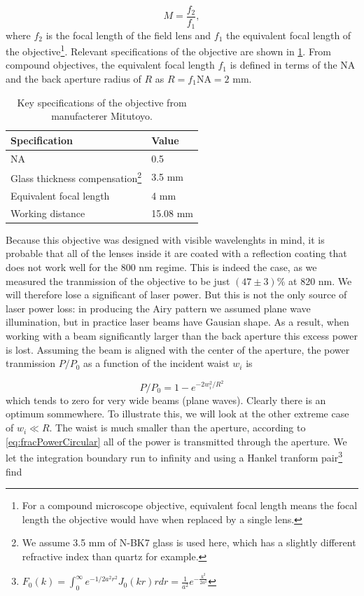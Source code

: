 \begin{equation}\label{eq:InfinityMagnification}
    M = \frac{f_2}{f_1},
\end{equation}
where $f_2$ is the focal length of the field lens and $f_1$ the equivalent focal length of the objective\footnote{For a compound microscope objective, equivalent focal length means the focal length the objective would have when replaced by a single lens.}.
Relevant specifications of the objective are shown in \cref{table:MitutoyoSpecs}. 
From compound objectives, the equivalent focal length $f_1$ is defined in terms of the \ac{NA} and the back aperture radius of $R$ as $R = f_1 \text{NA} = 2$ mm. 

\begin{table}[h]
    \centering
    \caption{Key specifications of the objective from manufacterer Mitutoyo.}
    \label{table:MitutoyoSpecs}
    \begin{tabular}{l | l}
        \textbf{Specification}       & \textbf{Value} \\ \hline 
        NA                           & 0.5            \\ \hline
        Glass thickness compensation\footnote{We assume 3.5 mm of N-BK7 glass is used here, which has a slightly different refractive index than quartz for example.} & 3.5 mm         \\ \hline
        Equivalent focal length      & 4 mm           \\ \hline
        Working distance             & 15.08 mm      
    \end{tabular}
\end{table}
Because this objective was designed with visible wavelenghts in mind, it is probable that all of the lenses inside it are coated with a reflection coating that does not work well for the 800 nm regime. 
This is indeed the case, as we measured the tranmission of the objective to be just $(47 \pm 3)\%$ at 820 nm. We will therefore lose a significant of laser power. 
But this is not the only source of laser power loss: in producing the Airy pattern we assumed plane wave illumination, but in practice laser beams have Gausian shape. 
As a result, when working with a beam significantly larger than the back aperture this excess power is lost. 
Assuming the beam is aligned with the center of the aperture, the power tranmission $P/P_0$ as a function of the incident waist $w_i$ is

\begin{equation}\label{eq:fracPowerCircular}
    P/P_0 = 1 - e^{-2w_i^2/R^2}
\end{equation}
which tends to zero for very wide beams (plane waves). Clearly there is an optimum sommewhere.
To illustrate this, we will look at the other extreme case of $w_i \ll R$. 
The waist is much smaller than the aperture, according to \cref{eq:fracPowerCircular} all of the power is transmitted through the aperture.
We let the integration boundary run to infinity and using a Hankel tranform pair\footnote{$F_0(k) = \int_0^{\infty} e^{-1/2 a^2 r^2} J_0(k r)r dr = \frac{1}{a^2} e^{-\frac{k^2}{2a^2}}$} find 

